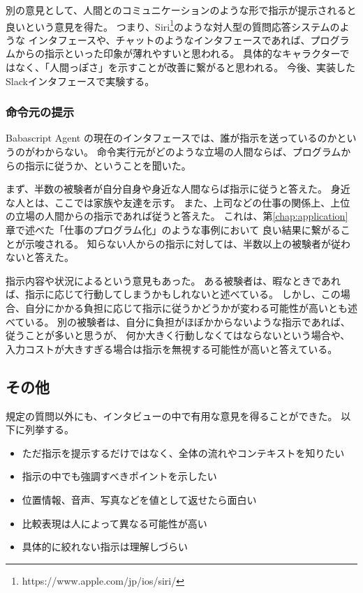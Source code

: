 別の意見として、人間とのコミュニケーションのような形で指示が提示されると良いという意見を得た。
つまり、Siri\footnote{https://www.apple.com/jp/ios/siri/}のような対人型の質問応答システムのような
インタフェースや、チャットのようなインタフェースであれば、プログラムからの指示といった印象が薄れやすいと思われる。
具体的なキャラクターではなく、「人間っぽさ」を示すことが改善に繋がると思われる。
今後、実装したSlackインタフェースで実験する。

\subsubsection{命令元の提示}\label{ux547dux4ee4ux5143ux306eux63d0ux793a}

Babascript Agent
の現在のインタフェースでは、誰が指示を送っているのかというのがわからない。
命令実行元がどのような立場の人間ならば、プログラムからの指示に従うか、ということを聞いた。

まず、半数の被験者が自分自身や身近な人間ならば指示に従うと答えた。
身近な人とは、ここでは家族や友達を示す。
また、上司などの仕事の関係上、上位の立場の人間からの指示であれば従うと答えた。
これは、第\ref{chap:application}章で述べた「仕事のプログラム化」のような事例において
良い結果に繋がることが示唆される。
知らない人からの指示に対しては、半数以上の被験者が従わないと答えた。

指示内容や状況によるという意見もあった。
ある被験者は、暇なときであれば、指示に応じて行動してしまうかもしれないと述べている。
しかし、この場合、自分にかかる負担に応じて指示に従うかどうかが変わる可能性が高いとも述べている。
別の被験者は、自分に負担がほぼかからないような指示であれば、従うことが多いと思うが、
何か大きく行動しなくてはならないという場合や、入力コストが大きすぎる場合は指示を無視する可能性が高いと答えている。

\subsection{その他}\label{ux305dux306eux4ed6}

規定の質問以外にも、インタビューの中で有用な意見を得ることができた。
以下に列挙する。

\begin{itemize}
\itemsep1pt\parskip0pt
\item
  ただ指示を提示するだけではなく、全体の流れやコンテキストを知りたい
\item
  指示の中でも強調すべきポイントを示したい
\item
  位置情報、音声、写真などを値として返せたら面白い
\item
  比較表現は人によって異なる可能性が高い
\item
  具体的に絞れない指示は理解しづらい
\end{itemize}

